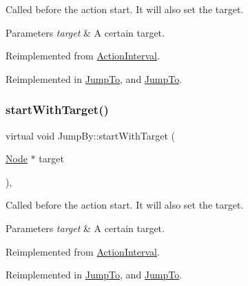 Called before the action start. It will also set the target.


\begin{DoxyParams}{Parameters}
{\em target} & A certain target. \\
\hline
\end{DoxyParams}


Reimplemented from \hyperlink{classActionInterval_ad3d91186b2c3108488ddbbdbbd982484}{Action\+Interval}.



Reimplemented in \hyperlink{classJumpTo_a64047a3cb37ccad99f74e6d1ee9dc271}{Jump\+To}, and \hyperlink{classJumpTo_abb2372358d593932355300cb89a79f96}{Jump\+To}.

\mbox{\label{classJumpBy_a1b06529f442819574e111837caf2c329}} 
\subsubsection{\texorpdfstring{start\+With\+Target()}{startWithTarget()}\hspace{0.1cm}{\footnotesize\ttfamily [2/2]}}
{\footnotesize\ttfamily virtual void Jump\+By\+::start\+With\+Target (\begin{DoxyParamCaption}\item[{\hyperlink{classNode}{Node} $\ast$}]{target }\end{DoxyParamCaption})\hspace{0.3cm}{\ttfamily [override]}, {\ttfamily [virtual]}}

Called before the action start. It will also set the target.


\begin{DoxyParams}{Parameters}
{\em target} & A certain target. \\
\hline
\end{DoxyParams}


Reimplemented from \hyperlink{classActionInterval_ad3d91186b2c3108488ddbbdbbd982484}{Action\+Interval}.



Reimplemented in \hyperlink{classJumpTo_a64047a3cb37ccad99f74e6d1ee9dc271}{Jump\+To}, and \hyperlink{classJumpTo_abb2372358d593932355300cb89a79f96}{Jump\+To}.

\mbox{\label{classJumpBy_a9c3f6254cee8c998018b3ffb94c3cede}} 
